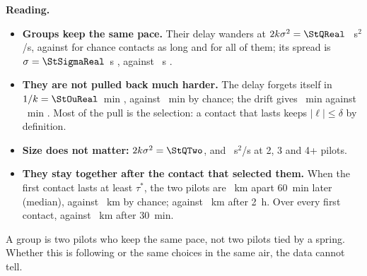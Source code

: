 \begin{reading}
\textbf{Reading.}
\begin{itemize}
  \item \textbf{Groups keep the same pace.} Their delay wanders at $2k\sigma^2=\StQReal$ \StQRealBand~s$^2$/s, against
        \StQChanceLong{} \StQChanceLongBand{} for chance contacts as long and \StQChance{} \StQChanceBand{} for all of them; its
        spread is $\sigma=\StSigmaReal$~s \StSigmaRealBand, against \StSigmaChance~s \StSigmaChanceBand.
  \item \textbf{They are not pulled back much harder.} The delay forgets itself in $1/k=\StOuReal$~min \StOuRealBand, against
        \StOuChance~min \StOuChanceBand{} by chance; the drift gives \StDriftReal~min \StDriftRealBand{} against \StDriftChance~min
        \StDriftChanceBand. Most of the pull is the selection: a contact that lasts keeps $|\ell|\le\delta$ by definition.
  \item \textbf{Size does not matter:} $2k\sigma^2=\StQTwo$, \StQThree{} and \StQFour~s$^2$/s at 2, 3 and 4+ pilots.
  \item \textbf{They stay together after the contact that selected them.} When the first contact lasts at least $\tau^*$,
        the two pilots are \StSepRealLongSixty~km apart 60~min later (median), against \StSepChanceLongSixty~km by chance;
        \StSepRealLongTwoHours{} against \StSepChanceLongTwoHours~km after 2~h. Over every first contact, \StSepRealThirty{} against
        \StSepChanceThirty~km after 30~min.
\end{itemize}
A group is two pilots who keep the same pace, not two pilots tied by a spring. Whether this is following
or the same choices in the same air, the data cannot tell.
\end{reading}
